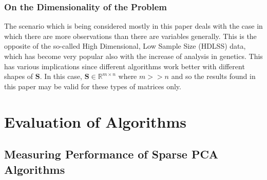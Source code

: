 \documentclass[11pt,a4paper]{article}
\newcommand{\inreal}{\in \mathbb{R}}
\newcommand{\smat}{\mathbf{S}}
\begin{document}




\subsubsection{On the Dimensionality of the Problem}
The scenario which is being considered mostly in this paper deals with the case in which there are more observations than there are variables generally. This is the opposite of the so-called High Dimensional, Low Sample Size (HDLSS) data, which has become very popular also with the increase of analysis in genetics. This has various implications since different algorithms work better with different shapes of $\smat$. In this case, $\smat \inreal^{m\times n}$ where $m >> n$ and so the results found in this paper may be valid for these types of matrices only. 


\clearpage

\section{Evaluation of Algorithms}
\subsection{Measuring Performance of Sparse PCA Algorithms}
\end{document}
